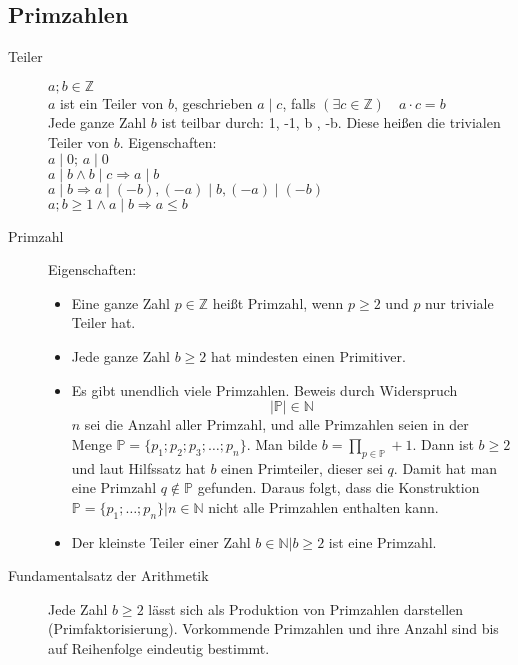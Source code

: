 \documentclass[12pt,a4paper]{article}
\begin{document}
\subsection{Primzahlen}
	\begin{description}
		\item[Teiler] $a;b \in \mathbb{Z}$\\
			$a$ ist ein Teiler von $b$, geschrieben $a \mid c$, falls $(\exists c \in \mathbb{Z})\quad a \cdot c = b$\\
			Jede ganze Zahl $b$ ist teilbar durch: 1, -1, b , -b. Diese heißen die trivialen Teiler von $b$. Eigenschaften: \\
			$a \mid 0;\, a \mid 0$ \\
			$a \mid b \wedge b \mid c \Rightarrow a \mid b$ \\
			$a \mid b \Rightarrow a \mid (-b), (-a) \mid b, (-a) \mid (-b)$ \\
			$a;b \geq 1 \wedge a \mid b \Rightarrow a \leq b$
		\item[Primzahl] Eigenschaften:
			\begin{itemize}
				\item Eine ganze Zahl $p \in \mathbb{Z}$ heißt Primzahl, wenn $p \geq 2$ und $p$ nur triviale Teiler hat.
				\item Jede ganze Zahl $b \geq 2$ hat mindesten einen Primitiver.
				\item Es gibt unendlich viele Primzahlen. Beweis durch Widerspruch
					$$|\mathbb{P}| \in \mathbb{N}$$
					$n$ sei die Anzahl aller Primzahl, und alle Primzahlen seien in der Menge $\mathbb{P} = \lbrace p_1;p_2;p_3;\dots ; p_n \rbrace$. Man bilde $b = \prod\limits_{p \in \mathbb{ P}} + 1$. Dann ist $b \geq 2$ und laut Hilfssatz hat $b$ einen Primteiler, dieser sei $q$. Damit hat man eine Primzahl $q \not \in \mathbb{P}$ gefunden. Daraus folgt, dass die Konstruktion $\mathbb{P} = \lbrace p_1; \dots; p_n \rbrace | n \in \mathbb{N}$ nicht alle Primzahlen enthalten kann.
				\item Der kleinste Teiler einer Zahl $b \in \mathbb{N}|b \geq 2$ ist eine Primzahl.
			\end{itemize}
		\item[Fundamentalsatz der Arithmetik] Jede Zahl $b \geq 2$ lässt sich als Produktion von Primzahlen darstellen (Primfaktorisierung). Vorkommende Primzahlen und ihre Anzahl sind bis auf Reihenfolge eindeutig bestimmt.
	\end{description}
\end{document}
